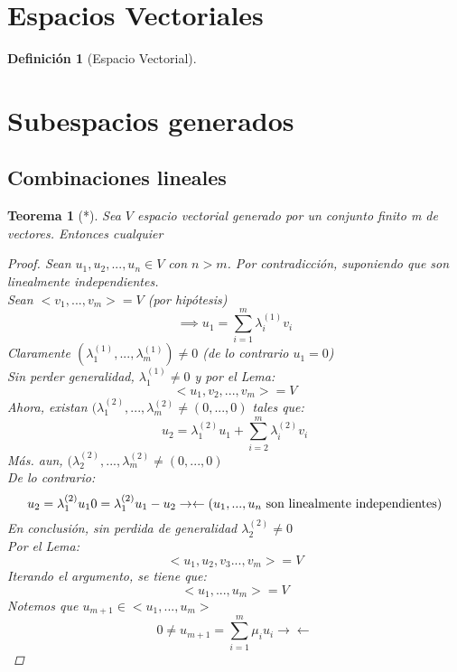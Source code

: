 \documentclass[11pt]{book}
\newtheorem{thm}{Teorema}[section]
\theoremstyle{definition}
\newtheorem{defn}{Definición}[section]
\begin{document}
\section{Espacios Vectoriales}
\begin{defn}[Espacio Vectorial]

\end{defn}
\section{Subespacios generados}
\subsection{Combinaciones lineales}
\begin{thm}[*]
	Sea $V$ espacio vectorial generado por un conjunto finito m de vectores. Entonces cualquier

	\begin{proof}
		Sean $u_1,u_2,...,u_n\in V$ con $n>m$. Por contradicción, suponiendo que son linealmente independientes.\\
		Sean $<v_1,...,v_m>=V$ (por hipótesis)
		\[
			\implies u_1=\sum^m_{i=1}\lambda_i^{(1)} v_i
		\]
		Claramente $(\lambda_1^{(1)},...,\lambda_m^{(1)})\neq 0$ (de lo contrario $u_1=0$)\\
		Sin perder generalidad, $\lambda_1^{(1)}\neq 0$ y por el Lema:
		\[
			<u_1,v_2,...,v_m>=V
		\]
		Ahora, existan $(\lambda_1^{(2)},...,\lambda_m^{(2)}\neq(0,...,0)$ tales que:
		\[
			u_2=\lambda_1^{(2)} u_1+\sum^m_{i=2}\lambda_i^{(2)}v_i
		\]
		Más. aun, $(\lambda_2^{(2)},...,\lambda_m^{(2)}\neq(0,...,0)$\\
		De lo contrario:
		\[
			u_2=\lambda_1^{(2)}u_1\\
			0=\lambda_1^{(2)}u_1-u_2\\
			\rightarrow\leftarrow (u_1,...,u_n\textrm{ son linealmente independientes})
		\]
		En conclusión, sin perdida de generalidad  $\lambda_2^{(2)}\neq 0$\\
		Por el Lema:
		\[
			<u_1,u_2,v_3...,v_m>=V
		\]
		Iterando el argumento, se tiene que:
		\[
			<u_1,...,u_m>=V
		\]
		Notemos que $u_{m+1}\in<u_1,...,u_m>$
		\[
			0\neq u_{m+1}=\sum^m_{i=1}\mu_i u_i
			\rightarrow\leftarrow
		\]
	\end{proof}
\end{thm}
\end{document}
